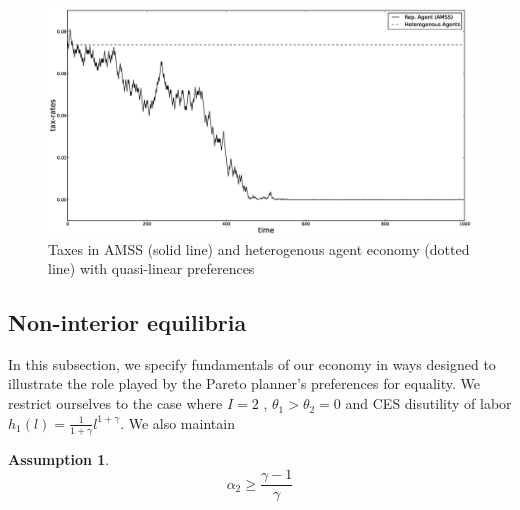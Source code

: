 \documentclass[thmsb,11pt]{article}
\newtheorem{assumption}{Assumption}
\begin{document}
  \begin{figure}[htp]
 \centering
 \includegraphics[width=\textwidth]{Draft25Graphs/BEGS_AMSS.eps}
 \caption{ Taxes in AMSS (solid line) and heterogenous agent economy (dotted line) with quasi-linear preferences}
 \label{fig: AMSS vs BEGS}
 \end{figure}

\smallskip

\subsection{\protect\smallskip Non-interior equilibria}\label{sec: Non Interior Eqb}

\smallskip
In this subsection, we specify fundamentals of our economy in  ways designed to illustrate the
role played by the Pareto planner's preferences for equality.
 We restrict ourselves to the case where $I=2$ , $\theta _{1}>\theta _{2}=0$ and CES disutility of labor $h_{1}\left( l\right) =\frac{1}{1+\gamma }%
l^{1+\gamma }$. We also maintain

\begin{assumption}
\label{ass:positivelabor}
\[\alpha_2\geq \frac{\gamma-1}{\gamma}\]
\end{assumption}
\end{document}
